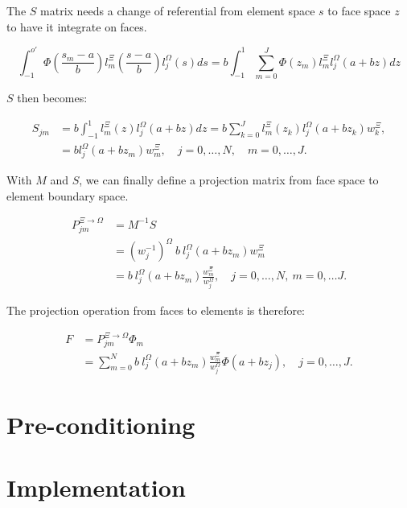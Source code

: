 The \(S\) matrix needs a change of referential from element space \(s\) to face space \(z\) to have
it integrate on faces.

\begin{equation}
	\int_{-1}^{o'} \Phi(\frac{s_m -a}{b})l_m^\Xi(\frac{s -a}{b}) l_j^\Omega(s)ds
	= b\int_{-1}^{1}\sum_{m = 0}^{J} \Phi(z_m)l_m^{\Xi}l_j^{\Omega}(a + bz)dz
\end{equation}

\noindent
\(S\) then becomes: 

\begin{equation}
	\begin{aligned}
		S_{jm} &=  b\int_{-1}^{1}l_m^{\Xi}(z)l_j^{\Omega}(a + bz)dz
		= b\sum_{k = 0}^{J}l_m^{\Xi}(z_k)l_j^{\Omega}(a +b z_k)w_k^{\Xi}, \\
		&= b l_j^{\Omega}(a + bz_m)w_m^{\Xi}, \quad j = 0, \ldots, N, \quad m = 0, \ldots, J.
	\end{aligned}
\end{equation}

With \(M\) and \(S\), we can finally define a projection matrix from face space to element boundary
space.

\begin{equation}
	\begin{aligned}
		P^{\Xi \rightarrow \Omega}_{jm} &= M^{-1}S \\
		&= {(w_j^{-1})}^{\Omega } \: b \: l_j^{\Omega }(a + bz_m)w_m^{\Xi}\\
		&= b \: l_j^{\Omega}(a + bz_m)\frac{w_m^{\Xi}}{w_j^{\Omega}}, \quad j = 0, \ldots, N, \: m = 0, \ldots J. 
	\end{aligned}
\end{equation} 

The projection operation from faces to elements is therefore:

\begin{align} \label{projection_face_to_element}
	F &= P^{\Xi \rightarrow \Omega}_{jm} \Phi_m  \\
	&= \sum_{m = 0}^{N} b \: l_j^{\Omega}(a + bz_m)\frac{w_m^{\Xi}}{w_j^{\Omega}} \Phi (a + b z_j), \quad j = 0, \ldots, J.
\end{align}

\section{Pre-conditioning}\label{section:adaptive_mesh_refinement:pre_conditioning}

\section{Implementation}\label{section:adaptive_mesh_refinement:implementation}

